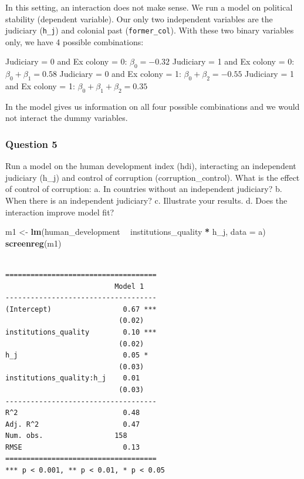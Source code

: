 \documentclass[]{article}
\newenvironment{Shaded}{\begin{snugshade}}{\end{snugshade}}
\newcommand{\KeywordTok}[1]{\textcolor[rgb]{0.13,0.29,0.53}{\textbf{#1}}}
\newcommand{\DataTypeTok}[1]{\textcolor[rgb]{0.13,0.29,0.53}{#1}}
\newcommand{\StringTok}[1]{\textcolor[rgb]{0.31,0.60,0.02}{#1}}
\newcommand{\OperatorTok}[1]{\textcolor[rgb]{0.81,0.36,0.00}{\textbf{#1}}}
\newcommand{\NormalTok}[1]{#1}
\theoremstyle{definition}
\theoremstyle{definition}
\theoremstyle{definition}
\theoremstyle{remark}
\begin{document}
In this setting, an interaction does not make sense. We run a model on
political stability (dependent variable). Our only two independent
variables are the judiciary (\texttt{h\_j}) and colonial past
(\texttt{former\_col}). With these two binary variables only, we have 4
possible combinations:

Judiciary = 0 and Ex colony = 0: \(\beta_0 = -0.32\) Judiciary = 1 and
Ex colony = 0: \(\beta_0 + \beta_1 = 0.58\) Judiciary = 0 and Ex colony
= 1: \(\beta_0 + \beta_2 = -0.55\) Judiciary = 1 and Ex colony = 1:
\(\beta_0 + \beta_1 + \beta_2 = 0.35\)

In the model gives us information on all four possible combinations and
we would not interact the dummy variables.

\subsubsection{Question 5}\label{question-5}

Run a model on the human development index (hdi), interacting an
independent judiciary (h\_j) and control of corruption
(corruption\_control). What is the effect of control of corruption: a.
In countries without an independent judiciary? b. When there is an
independent judiciary? c. Illustrate your results. d. Does the
interaction improve model fit?

\begin{Shaded}
\begin{Highlighting}[]
\NormalTok{m1 <-}\StringTok{ }\KeywordTok{lm}\NormalTok{(human_development }\OperatorTok{~}\StringTok{ }\NormalTok{institutions_quality }\OperatorTok{*}\StringTok{ }\NormalTok{h_j, }\DataTypeTok{data =}\NormalTok{ a)}
\KeywordTok{screenreg}\NormalTok{(m1)}
\end{Highlighting}
\end{Shaded}

\begin{verbatim}

====================================
                          Model 1   
------------------------------------
(Intercept)                 0.67 ***
                           (0.02)   
institutions_quality        0.10 ***
                           (0.02)   
h_j                         0.05 *  
                           (0.03)   
institutions_quality:h_j    0.01    
                           (0.03)   
------------------------------------
R^2                         0.48    
Adj. R^2                    0.47    
Num. obs.                 158       
RMSE                        0.13    
====================================
*** p < 0.001, ** p < 0.01, * p < 0.05
\end{verbatim}
\end{document}

